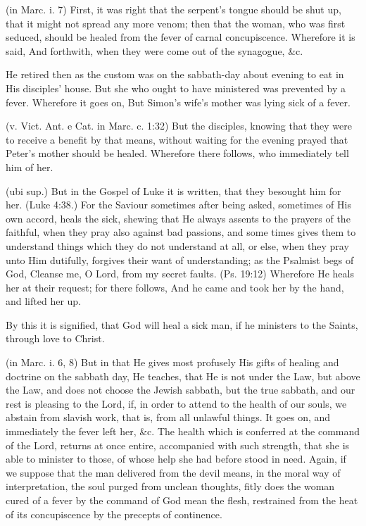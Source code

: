  (in Marc. i. 7) First, it was right that the serpent’s tongue should be shut up, that it might not spread any more venom; then that the woman, who was first seduced, should be healed from the fever of carnal concupiscence. Wherefore it is said, And forthwith, when they were come out of the synagogue, \&c.

 He retired then as the custom was on the sabbath-day about evening to eat in His disciples’ house. But she who ought to have ministered was prevented by a fever. Wherefore it goes on, But Simon’s wife’s mother was lying sick of a fever.

 (v. Vict. Ant. e Cat. in Marc. c. 1:32) But the disciples, knowing that they were to receive a benefit by that means, without waiting for the evening prayed that Peter’s mother should be healed. Wherefore there follows, who immediately tell him of her.

 (ubi sup.) But in the Gospel of Luke it is written, that they besought him for her. (Luke 4:38.) For the Saviour sometimes after being asked, sometimes of His own accord, heals the sick, shewing that He always assents to the prayers of the faithful, when they pray also against bad passions, and some times gives them to understand things which they do not understand at all, or else, when they pray unto Him dutifully, forgives their want of understanding; as the Psalmist begs of God, Cleanse me, O Lord, from my secret faults. (Ps. 19:12) Wherefore He heals her at their request; for there follows, And he came and took her by the hand, and lifted her up.

 By this it is signified, that God will heal a sick man, if he ministers to the Saints, through love to Christ.

 (in Marc. i. 6, 8) But in that He gives most profusely His gifts of healing and doctrine on the sabbath day, He teaches, that He is not under the Law, but above the Law, and does not choose the Jewish sabbath, but the true sabbath, and our rest is pleasing to the Lord, if, in order to attend to the health of our souls, we abstain from slavish work, that is, from all unlawful things. It goes on, and immediately the fever left her, \&c. The health which is conferred at the command of the Lord, returns at once entire, accompanied with such strength, that she is able to minister to those, of whose help she had before stood in need. Again, if we suppose that the man delivered from the devil means, in the moral way of interpretation, the soul purged from unclean thoughts, fitly does the woman cured of a fever by the command of God mean the flesh, restrained from the heat of its concupiscence by the precepts of continence.

